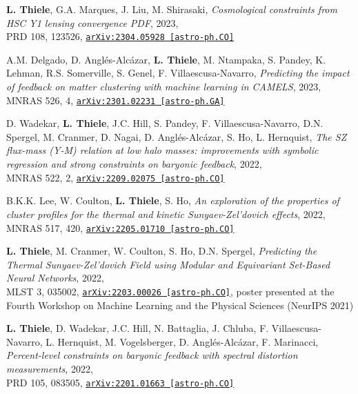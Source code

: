 {\bf L. Thiele}, G.A. Marques, J. Liu, M. Shirasaki,
\emph{Cosmological constraints from HSC Y1 lensing convergence PDF}, 2023,\\
PRD 108, 123526,
\href{https://arxiv.org/abs/2304.05928}{\mbox{\texttt{arXiv:2304.05928 [astro-ph.CO]}}}

\newpage
\vspace*{0.5cm}

A.M. Delgado, D. Angl\'es-Alc\'azar, {\bf L. Thiele}, M. Ntampaka, S. Pandey,
K. Lehman, R.S. Somerville, S. Genel, F. Villaescusa-Navarro,
\emph{Predicting the impact of feedback on matter clustering with machine learning
      in CAMELS}, 2023,\\
MNRAS 526, 4,
\href{https://arxiv.org/abs/2301.02231}{\mbox{\texttt{arXiv:2301.02231 [astro-ph.GA]}}}

D. Wadekar, {\bf L. Thiele}, J.C. Hill, S. Pandey, F. Villaescusa-Navarro,
D.N. Spergel, M. Cranmer, D. Nagai, D. Angl\'es-Alc\'azar, S. Ho, L. Hernquist,
\emph{The SZ flux-mass (Y-M) relation at low halo masses: improvements with
      symbolic regression and strong constraints on baryonic feedback}, 2022,\\
MNRAS 522, 2,
\href{https://arxiv.org/abs/2209.02075}{\mbox{\texttt{arXiv:2209.02075 [astro-ph.CO]}}}

B.K.K. Lee, W. Coulton, {\bf L. Thiele}, S. Ho,
\emph{An exploration of the properties of cluster profiles for the thermal
      and kinetic Sunyaev-Zel'dovich effects}, 2022,\\
MNRAS 517, 420,
\href{https://arxiv.org/abs/2205.01710}{\mbox{\texttt{arXiv:2205.01710 [astro-ph.CO]}}}

{\bf L. Thiele}, M. Cranmer, W. Coulton, S. Ho, D.N. Spergel,
\emph{Predicting the Thermal Sunyaev-Zel'dovich Field
      using Modular and Equivariant Set-Based Neural Networks}, 2022,\\
MLST 3, 035002,
\href{https://arxiv.org/abs/2203.00026}{\mbox{\texttt{arXiv:2203.00026 [astro-ph.CO]}}},
poster presented at the Fourth Workshop on Machine Learning and the Physical Sciences (NeurIPS 2021)

{\bf L. Thiele}, D. Wadekar, J.C. Hill, N. Battaglia, J. Chluba,
F. Villaescusa-Navarro, L. Hernquist, M. Vogelsberger, D. Angl\'es-Alc\'azar,
F. Marinacci,
\emph{Percent-level constraints on baryonic feedback with spectral distortion
      measurements}, 2022,\\
PRD 105, 083505,
\href{https://arxiv.org/abs/2201.01663}{\mbox{\texttt{arXiv:2201.01663 [astro-ph.CO]}}}

